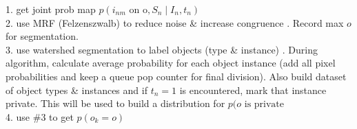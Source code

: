 \documentclass[11pt]{article}
\begin{document}
1. get joint prob map $p(i_{nm} \textrm{ on o}, S_n \mid I_n, t_n)$\\
2. use MRF (Felzenszwalb) to reduce noise \& increase congruence \cite{felzenszwalb2006efficient}.  Record max $o$ for segmentation.\\
3. use watershed segmentation to label objects (type \& instance) \cite{87344}. During algorithm, calculate average probability for each object instance (add all pixel probabilities and keep a queue pop counter for final division).  Also build dataset of object types \& instances and if $t_n=1$ is encountered, mark that instance private.  This will be used to build a distribution for $p(o \textrm{ is private}$\\
4. use \#3 to get $p(o_k = o)$\\
 




\newpage


\end{document}
